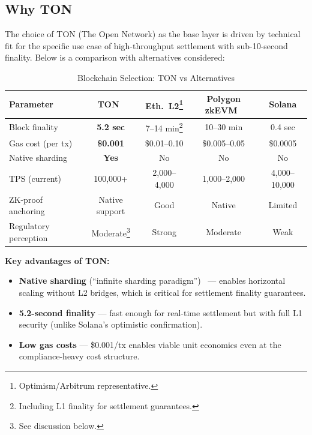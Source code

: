 \documentclass[11pt,a4paper]{article}
\begin{document}
\subsection*{Why TON}
\label{sec:why_ton}

The choice of TON (The Open Network) as the base layer is driven by technical fit for the specific use case of high-throughput settlement with sub-10-second finality. Below is a comparison with alternatives considered:

\begin{table}[htbp]
\centering
\caption{Blockchain Selection: TON vs Alternatives}
\footnotesize
{\setlength{\tabcolsep}{4pt}
\begin{tabularx}{\linewidth}{@{}lCCCC@{}}
\toprule
\textbf{Parameter} & \textbf{TON}~\cite{ton_wp,ton_docs} & \textbf{Eth.\ L2}\footnote{Optimism/Arbitrum representative.} & \textbf{Polygon zkEVM}~\cite{plonky2} & \textbf{Solana} \\
\midrule
Block finality        & \textbf{5.2 sec} & 7--14 min\footnote{Including L1 finality for settlement guarantees.} & 10--30 min & 0.4 sec \\
Gas cost (per tx)     & \textbf{\$0.001} & \$0.01--0.10 & \$0.005--0.05 & \$0.0005 \\
Native sharding       & \textbf{Yes}     & No           & No            & No \\
TPS (current)         & 100,000+         & 2,000--4,000 & 1,000--2,000  & 4,000--10,000 \\
ZK-proof anchoring    & Native support   & Good         & Native        & Limited \\
Regulatory perception & Moderate\footnote{See discussion below.} & Strong & Moderate & Weak \\
\bottomrule
\end{tabularx}
}%
\end{table}

\noindent\textbf{Key advantages of TON:}
\begin{itemize}[leftmargin=2em, itemsep=3pt, parsep=0pt]
\item \textbf{Native sharding} (``infinite sharding paradigm'')~\cite{ton_wp} --- enables horizontal scaling without L2 bridges, which is critical for settlement finality guarantees.
\item \textbf{5.2-second finality} --- fast enough for real-time settlement but with full L1 security (unlike Solana's optimistic confirmation).
\item \textbf{Low gas costs} --- \$0.001/tx enables viable unit economics even at the compliance-heavy cost structure.
\end{itemize}
\end{document}
